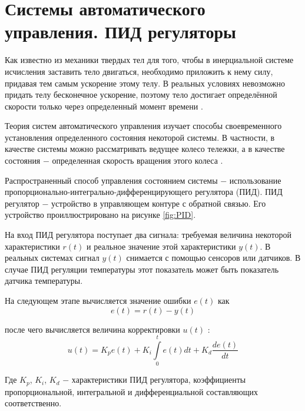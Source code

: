 \documentclass[oneside,final,14pt]{extreport}
\begin{document}
\section{Системы автоматического управления. ПИД регуляторы}
Как известно из механики твердых тел для того, чтобы в инерциальной системе исчисления заставить тело двигаться, необходимо приложить к нему силу, придавая тем самым ускорение этому телу. В реальных условиях невозможно придать телу бесконечное ускорение, поэтому тело достигает определённой скорости только через определенный момент времени \cite{Saveliev}. 

Теория систем автоматического управления изучает способы своевременного установления определенного состояния некоторой системы. В частности, в качестве системы можно рассматривать ведущее колесо тележки, а в качестве состояния $-$ определенная скорость вращения этого колеса \cite{pidBook}.

Распространенный способ управления состоянием системы $-$  использование пропорционально-интегрально-дифференцирующего регулятора (ПИД). ПИД регулятор $-$ устройство в управляющем контуре с обратной связью. Его устройство проиллюстрировано  на рисунке \ref{fig:PID}.


\begin{figure}[H]
\end{figure}

На вход ПИД регулятора поступает два сигнала: требуемая величина некоторой характеристики $r(t)$ и реальное значение этой характеристики $y(t)$. В реальных системах сигнал  $y(t)$ снимается с помощью сенсоров или датчиков. В случае ПИД регуляции температуры этот показатель может быть показатель датчика температуры. 

На следующем этапе вычисляется значение ошибки $e(t)$  как 
\begin{equation}
e(t)
=
r(t) - y(t)
\end{equation}

после чего вычисляется величина корректировки $u(t)$ :
\begin{equation}
u(t)
=
K_{p} e(t)
+
K_{i} \int\limits_{0}^{t} e(t) dt
+
K_{d} 
\frac{d e(t)}{dt}
\end{equation} 

Где $K_p$, $K_i$, $K_d$ $-$ характеристики ПИД регулятора, коэффициенты  пропорциональной, интегральной и дифференциальной составляющих соответственно.
\end{document}
